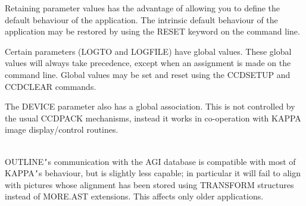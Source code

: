 \documentclass[twoside,11pt]{article}
\newcommand{\xref}[3]{#1}
\renewcommand{\_}{\texttt{\symbol{95}}}
\newcommand{\routine}[1]{{\sc #1}}
\newcommand{\sstimplementationstatus}[1]{
   \item[{Implementation Status:}] \mbox{} \\[1.3ex] #1}
\newcommand{\sstimplementationstatus}[1]{
      \item[Implementation Status:] #1
   }
\begin{document}
{{      Retaining parameter values has the advantage of allowing you to
      define the default behaviour of the application. The intrinsic
      default behaviour of the application may be restored by using the
      RESET keyword on the command line.

      Certain parameters (LOGTO and LOGFILE) have global
      values. These global values will always take precedence, except
      when an assignment is made on the command line. Global values may
      be set and reset using the CCDSETUP and CCDCLEAR commands.

      The DEVICE parameter also has a global association. This is not
      controlled by the usual CCDPACK mechanisms, instead it works in
      co-operation with \xref{KAPPA}{sun95}{} image display/control routines.
   }
   \sstimplementationstatus{
      \routine{OUTLINE}{\tt '}s communication with the AGI database is compatible with
      most of KAPPA{\tt '}s behaviour, but is slightly less capable; in
      particular it will fail to align with pictures whose alignment
      has been stored using TRANSFORM structures instead of MORE.AST
      extensions.  This affects only older applications.
   }
}
\end{document}
